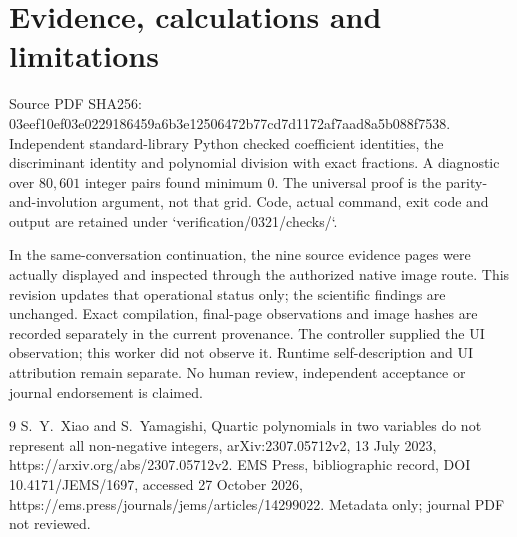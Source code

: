 \documentclass[10pt]{article}
\begin{document}
\section*{Evidence, calculations and limitations}
Source PDF SHA256: 03eef10ef03e0229186459a6b3e12506472b77cd7d1172af7aad8a5b088f7538. Independent standard-library Python checked coefficient identities, the discriminant identity and polynomial division with exact fractions. A diagnostic over \(80{,}601\) integer pairs found minimum 0. The universal proof is the parity-and-involution argument, not that grid. Code, actual command, exit code and output are retained under `verification/0321/checks/`.\par
In the same-conversation continuation, the nine source evidence pages were actually displayed and inspected through the authorized native image route. This revision updates that operational status only; the scientific findings are unchanged. Exact compilation, final-page observations and image hashes are recorded separately in the current provenance. The controller supplied the UI observation; this worker did not observe it. Runtime self-description and UI attribution remain separate. No human review, independent acceptance or journal endorsement is claimed.\par
9 S. Y. Xiao and S. Yamagishi, Quartic polynomials in two variables do not represent all non-negative integers, arXiv:2307.05712v2, 13 July 2023, https://arxiv.org/abs/2307.05712v2. EMS Press, bibliographic record, DOI 10.4171/JEMS/1697, accessed 27 October 2026, https://ems.press/journals/jems/articles/14299022. Metadata only; journal PDF not reviewed.\par
\end{document}

